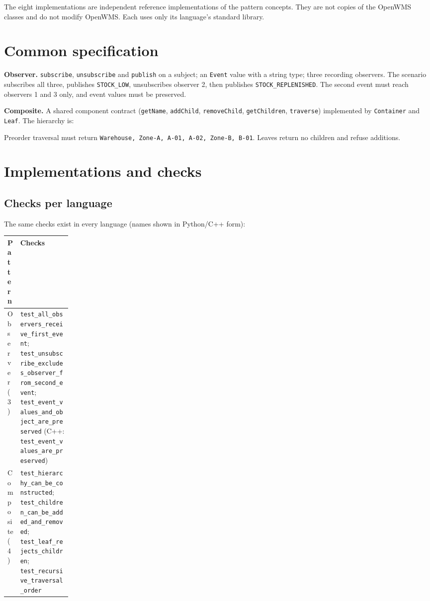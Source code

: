 \documentclass[11pt,a4paper]{article}
\newcommand{\code}[1]{\nolinkurl{#1}}
\begin{document}
The eight implementations are independent reference implementations of the pattern concepts. They are not copies of the OpenWMS classes and do not modify OpenWMS. Each uses only its language's standard library.

\section{Common specification}
\textbf{Observer.} \code{subscribe}, \code{unsubscribe} and \code{publish} on a subject; an \code{Event} value with a string type; three recording observers. The scenario subscribes all three, publishes \code{STOCK_LOW}, unsubscribes observer 2, then publishes \code{STOCK_REPLENISHED}. The second event must reach observers 1 and 3 only, and event values must be preserved.

\textbf{Composite.} A shared component contract (\code{getName}, \code{addChild}, \code{removeChild}, \code{getChildren}, \code{traverse}) implemented by \code{Container} and \code{Leaf}. The hierarchy is:

\begin{center}
\end{center}
Preorder traversal must return \code{Warehouse, Zone-A, A-01, A-02, Zone-B, B-01}. Leaves return no children and refuse additions.

\section{Implementations and checks}

\subsection{Checks per language}
The same checks exist in every language (names shown in Python/C++ form):

\begin{tabularx}{\linewidth}{@{}P{0.15\linewidth}Y@{}}
\toprule
Pattern & Checks\\
\midrule
Observer (3) & \code{test_all_observers_receive_first_event}; \code{test_unsubscribe_excludes_observer_from_second_event}; \code{test_event_values_and_object_are_preserved} (C++: \code{test_event_values_are_preserved})\\
Composite (4) & \code{test_hierarchy_can_be_constructed}; \code{test_children_can_be_added_and_removed}; \code{test_leaf_rejects_children}; \code{test_recursive_traversal_order}\\
\bottomrule
\end{tabularx}
\end{document}
